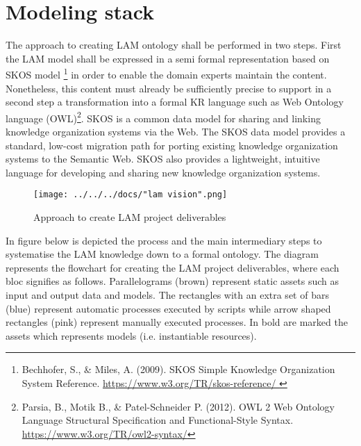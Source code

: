 
\section{Modeling stack}\label{ariaid-title1}

The approach to creating LAM ontology shall be performed in two steps.
First the LAM model shall be expressed in a semi formal representation
based on SKOS model \footnote{Bechhofer, S., \& 	Miles, A. (2009). SKOS Simple Knowledge Organization System Reference. \url{https://www.w3.org/TR/skos-reference/ }} in
order to enable the domain experts maintain the content. Nonetheless,
this content must already be sufficiently precise to support in a second
step a transformation into a formal KR language such as Web Ontology
language (OWL)\footnote{Parsia, B., Motik B.,  \& Patel-Schneider P. (2012). OWL 2 Web Ontology Language Structural Specification and Functional-Style Syntax. \url{https://www.w3.org/TR/owl2-syntax/}}. 
SKOS is a common data model for sharing and linking knowledge organization systems via the Web. The SKOS data model provides a standard, low-cost migration path for porting existing knowledge organization systems to the Semantic Web. SKOS also provides a lightweight, intuitive language for developing and sharing new knowledge organization systems.

\begin{figure}[!ht]
	\centering
	\texttt{[image: ../../../docs/"lam vision".png]}
	\caption{Approach to create LAM project deliverables}
	\label{ont-req-modelling-stack__process-fig}
\end{figure}


In figure below is depicted the process and the main intermediary steps
to systematise the LAM knowledge down to a formal ontology. The diagram
represents the flowchart for creating the LAM project deliverables,
where each bloc signifies as follows. Parallelograms (brown) represent
static assets such as input and output data and models. The rectangles
with an extra set of bars (blue) represent automatic processes executed
by scripts while arrow shaped rectangles (pink) represent manually
executed processes. In bold are marked the assets which represents
models (i.e. instantiable resources).


